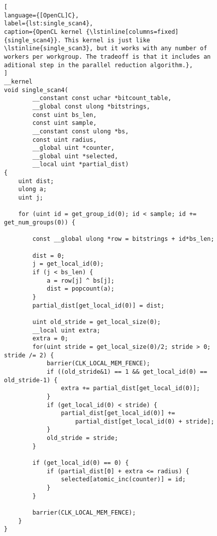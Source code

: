 \begin{figure}[!p]
\begin{lstlisting}[
language={[OpenCL]C},
label={lst:single_scan4},
caption={OpenCL kernel {\lstinline[columns=fixed]{single_scan4}}. This kernel is just like \lstinline{single_scan3}, but it works with any number of workers per workgroup. The tradeoff is that it includes an aditional step in the parallel reduction algorithm.},
]
__kernel
void single_scan4(
        __constant const uchar *bitcount_table,
        __global const ulong *bitstrings,
        const uint bs_len,
        const uint sample,
        __constant const ulong *bs,
        const uint radius,
        __global uint *counter,
        __global uint *selected,
        __local uint *partial_dist)
{
    uint dist;
    ulong a;
    uint j;

    for (uint id = get_group_id(0); id < sample; id += get_num_groups(0)) {

        const __global ulong *row = bitstrings + id*bs_len;

        dist = 0;
        j = get_local_id(0);
        if (j < bs_len) {
            a = row[j] ^ bs[j];
            dist = popcount(a);
        }
        partial_dist[get_local_id(0)] = dist;

        uint old_stride = get_local_size(0);
        __local uint extra;
        extra = 0;
        for(uint stride = get_local_size(0)/2; stride > 0; stride /= 2) {
            barrier(CLK_LOCAL_MEM_FENCE);
            if ((old_stride&1) == 1 && get_local_id(0) == old_stride-1) {
                extra += partial_dist[get_local_id(0)];
            }
            if (get_local_id(0) < stride) {
                partial_dist[get_local_id(0)] +=
                    partial_dist[get_local_id(0) + stride];
            }
            old_stride = stride;
        }

        if (get_local_id(0) == 0) {
            if (partial_dist[0] + extra <= radius) {
                selected[atomic_inc(counter)] = id;
            }
        }

        barrier(CLK_LOCAL_MEM_FENCE);
    }
}
\end{lstlisting}
\end{figure}

